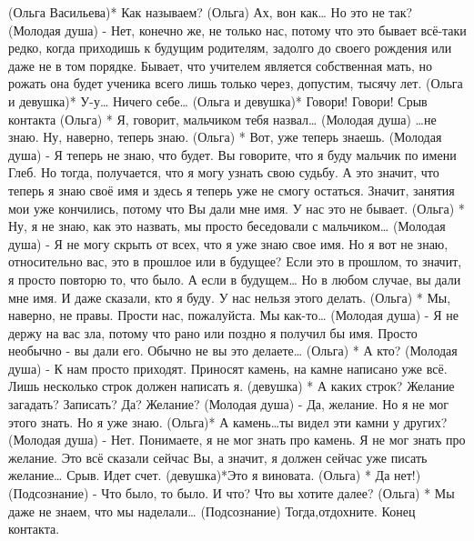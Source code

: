(Ольга Васильева)* Как называем?
(Ольга) Ах, вон как… Но это не так?
(Молодая душа) - Нет, конечно же, не только нас, потому что это бывает всё-таки редко, когда приходишь к будущим родителям, задолго до своего рождения или даже не в том порядке. Бывает, что учителем является собственная мать, но рожать она будет ученика всего лишь только через, допустим, тысячу лет. 
(Ольга и девушка)* У-у… Ничего себе… 
(Ольга и девушка)* Говори! Говори!
Срыв контакта
(Ольга) * Я, говорит, мальчиком тебя назвал…
(Молодая душа) …не знаю. Ну, наверно, теперь знаю.
(Ольга) * Вот, уже теперь знаешь.
(Молодая душа) - Я теперь не знаю, что будет. Вы говорите, что я буду мальчик по имени Глеб. Но тогда, получается, что я могу узнать свою судьбу. А это значит, что теперь я знаю своё имя и здесь я теперь уже не смогу остаться. Значит, занятия мои уже кончились, потому что Вы дали мне имя. У нас это не бывает.
(Ольга) * Ну, я не знаю, как это назвать, мы просто беседовали с мальчиком…
(Молодая душа) - Я не могу скрыть от всех, что я уже знаю свое имя. Но я вот не знаю, относительно вас, это в прошлое или в будущее? Если это в прошлом, то значит, я просто повторю то, что было. А если в будущем… Но в любом случае, вы дали мне имя. И даже сказали, кто я буду. У нас нельзя этого делать.
(Ольга) * Мы, наверно, не правы. Прости нас, пожалуйста. Мы как-то…
(Молодая душа) -  Я не держу на вас зла, потому что рано или поздно я получил бы имя. Просто необычно -  вы дали его. Обычно не вы это делаете…
(Ольга) * А кто?
(Молодая душа) - К нам просто приходят. Приносят камень, на камне написано уже всё. Лишь несколько строк должен написать я.
(девушка) * А каких строк? Желание загадать? Записать? Да? Желание?
(Молодая душа) - Да, желание. Но я не мог этого знать. Но я уже знаю.
(Ольга)* А камень…ты видел эти камни у других?
(Молодая душа) - Нет. Понимаете, я не мог знать про камень. Я не мог знать про желание. Это всё сказали сейчас Вы, а значит, я должен сейчас уже писать желание…
Срыв. Идет счет.
(девушка)*Это я виновата.
(Ольга) * Да нет!)
(Подсознание) - Что было, то было. И что? Что вы хотите далее?
(Ольга) * Мы даже не знаем, что мы наделали…
(Подсознание) Тогда,отдохните.
Конец контакта.